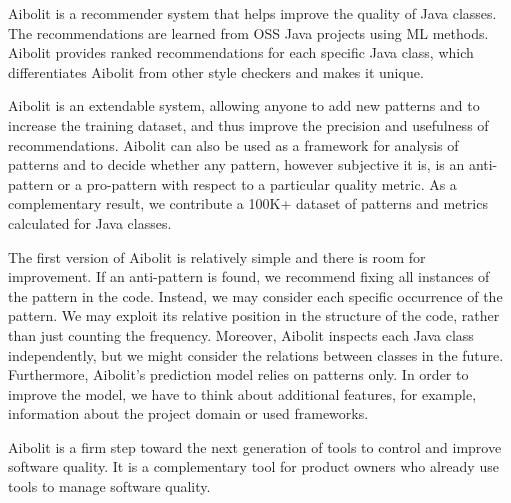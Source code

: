 
Aibolit is a recommender system that helps improve the quality of Java classes.
The recommendations are learned from OSS Java projects using ML methods.
Aibolit provides ranked recommendations for each specific Java class,
which differentiates Aibolit from other style checkers and makes it unique.

Aibolit is an extendable system, allowing anyone to add new patterns and to
increase the training dataset, and thus improve the precision and usefulness
of recommendations. Aibolit can also be used as a framework for analysis of
patterns and to decide whether any pattern, however subjective it is, is an anti-pattern or a pro-pattern
with respect to a particular quality metric. As a complementary result,
we contribute a 100K+ dataset of patterns and metrics calculated for Java classes.

The first version of Aibolit is relatively simple and there is room
for improvement. If an anti-pattern is found, we recommend fixing all instances
of the pattern in the code. Instead, we may consider each specific occurrence of the pattern.
We may exploit its relative position in the structure of the code, rather than just counting
the frequency. Moreover, Aibolit inspects each Java class independently, but
we might consider the relations between classes in the future. Furthermore,
Aibolit's prediction model relies on patterns only. In order to improve the model,
we have to think about additional features, for example, information about
the project domain or used frameworks.

Aibolit is a firm step toward the next generation of tools to control
and improve software quality. It is a complementary tool for
product owners who already use tools to manage software quality.
